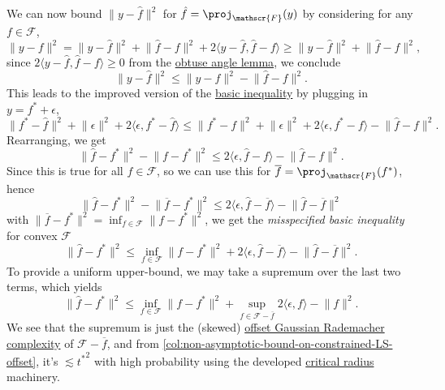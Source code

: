 We can now bound \(\lVert y - \hat{f} \rVert ^2\) for \(\hat{f} = \proj_{\mathscr{F} }(y)\) by considering for any \(f\in \mathscr{F} \),
\[
	\lVert y - f \rVert ^2
	= \lVert y - \hat{f}  \rVert ^2 + \lVert \hat{f} - f \rVert ^2 + 2 \langle y - \hat{f} , \hat{f} - f \rangle
	\geq \lVert y - \hat{f}  \rVert ^2 + \lVert \hat{f} - f \rVert ^2,
\]
since \(2 \langle y - \hat{f} , \hat{f} - f \rangle \geq 0\) from the \hyperref[lma:obtuse-angle]{obtuse angle lemma}, we conclude
\[
	\lVert y - \hat{f} \rVert ^2
	\leq \lVert y - f \rVert ^2 - \lVert \hat{f} - f \rVert ^2.
\]
This leads to the improved version of the \hyperref[eq:basic-inequality]{basic inequality} by plugging in \(y = f^{\ast} + \epsilon \),
\[
	\lVert f^{\ast} - \hat{f}  \rVert ^2 + \lVert \epsilon  \rVert ^2 + 2 \langle \epsilon , f^{\ast} - \hat{f}  \rangle
	\leq \lVert f^{\ast} - f \rVert ^2 + \lVert \epsilon  \rVert ^2 + 2 \langle \epsilon , f^{\ast} - f \rangle - \lVert \hat{f} - f \rVert ^2.
\]
Rearranging, we get
\[
	\lVert \hat{f} - f^{\ast}  \rVert ^2 - \lVert f - f^{\ast}  \rVert ^2
	\leq 2 \langle \epsilon , \hat{f} - f \rangle - \lVert \hat{f} - f \rVert ^2.
\]
Since this is true for all \(f\in \mathscr{F} \), so we can use this for \(\overline{f} = \proj_{\mathscr{F} } (f^{\ast} ) \), hence
\[
	\lVert \hat{f} - f^{\ast}  \rVert ^2 - \lVert \overline{f} - f^{\ast}  \rVert ^2
	\leq 2 \langle \epsilon , \hat{f} - \overline{f} \rangle - \lVert \hat{f} - \overline{f} \rVert ^2
\]
with \(\lVert \overline{f} - f^{\ast} \rVert ^2 = \inf _{f\in \mathscr{F} } \lVert f - f^{\ast} \rVert ^2\), we get the \emph{misspecified basic inequality} for convex \(\mathscr{F} \)
\begin{equation}\label{eq:misspecified-convex-basic-inequality}
	\lVert \hat{f} - f^{\ast} \rVert ^2
	\leq \inf _{f\in \mathscr{F} } \lVert f - f^{\ast}  \rVert ^2 + 2 \langle \epsilon , \hat{f} - \overline{f} \rangle - \lVert \hat{f} - \overline{f} \rVert ^2.
\end{equation}
To provide a uniform upper-bound, we may take a supremum over the last two terms, which yields
\[
	\lVert \hat{f} - f^{\ast} \rVert ^2
	\leq \inf _{f\in \mathscr{F} } \lVert f - f^{\ast}  \rVert ^2 + \sup _{f\in \mathscr{F} - \overline{f} } 2\langle \epsilon , f \rangle - \lVert f \rVert ^2.
\]
We see that the supremum is just the (skewed) \hyperref[def:offset-Gaussian-Rademacher-complexity]{offset Gaussian Rademacher complexity} of \(\mathscr{F} - \overline{f} \), and from \autoref{col:non-asymptotic-bound-on-constrained-LS-offset}, it's \( \lesssim {t^{\ast} }^2\) with high probability using the developed \hyperref[def:critical-radius]{critical radius} machinery.

